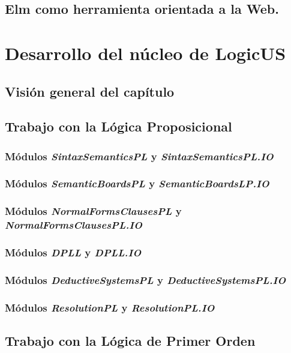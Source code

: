 \documentclass[fleqn, 11pt, a4paper]{book}
\begin{document}
\section{Elm como herramienta orientada a la Web.}


\chapter{Desarrollo del núcleo de LogicUS}

\minitoc

\newpage

\section{Visión general del capítulo}

\section{Trabajo con la Lógica Proposicional}
\subsection{Módulos \textit{SintaxSemanticsPL} y \textit{SintaxSemanticsPL.IO}}
\subsection{Módulos \textit{SemanticBoardsPL} y \textit{SemanticBoardsLP.IO}}
\subsection{Módulos \textit{NormalFormsClausesPL} y \textit{NormalFormsClausesPL.IO}}
\subsection{Módulos \textit{DPLL} y \textit{DPLL.IO}}
\subsection{Módulos \textit{DeductiveSystemsPL} y \textit{DeductiveSystemsPL.IO}}
\subsection{Módulos \textit{ResolutionPL} y \textit{ResolutionPL.IO}}

\section{Trabajo con la Lógica de Primer Orden}
\end{document}
